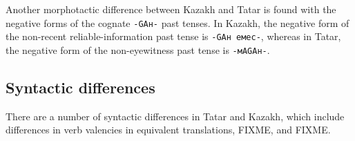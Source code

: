 \documentclass[11pt]{article}
\begin{document}
Another morphotactic difference between Kazakh and Tatar is found with the negative forms of the cognate \texttt{-GAн-} past tenses.  In Kazakh, the negative form of the non-recent reliable-information past tense is \texttt{-GAн емес-}, whereas in Tatar, the negative form of the non-eyewitness past tense is \texttt{-мAGAн-}.


%

%

\subsection{Syntactic differences}

There are a number of syntactic differences in Tatar and Kazakh, which include differences in verb valencies in equivalent translations, FIXME, and FIXME.

\end{document}
